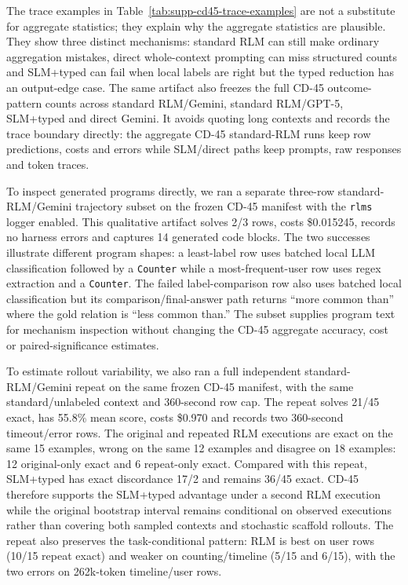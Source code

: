 \documentclass[letterpaper]{article}
\begin{document}
The trace examples in Table~\ref{tab:supp-cd45-trace-examples} are not a substitute for aggregate statistics; they explain why the aggregate statistics are plausible. They show three distinct mechanisms: standard RLM can still make ordinary aggregation mistakes, direct whole-context prompting can miss structured counts and SLM+typed can fail when local labels are right but the typed reduction has an output-edge case. The same artifact also freezes the full CD-45 outcome-pattern counts across standard RLM/Gemini, standard RLM/GPT-5, SLM+typed and direct Gemini. It avoids quoting long contexts and records the trace boundary directly: the aggregate CD-45 standard-RLM runs keep row predictions, costs and errors while SLM/direct paths keep prompts, raw responses and token traces.

To inspect generated programs directly, we ran a separate three-row standard-RLM/Gemini trajectory subset on the frozen CD-45 manifest with the \texttt{rlms} logger enabled. This qualitative artifact solves 2/3 rows, costs \$0.015245, records no harness errors and captures 14 generated code blocks. The two successes illustrate different program shapes: a least-label row uses batched local LLM classification followed by a \texttt{Counter} while a most-frequent-user row uses regex extraction and a \texttt{Counter}. The failed label-comparison row also uses batched local classification but its comparison/final-answer path returns ``more common than'' where the gold relation is ``less common than.'' The subset supplies program text for mechanism inspection without changing the CD-45 aggregate accuracy, cost or paired-significance estimates.

To estimate rollout variability, we also ran a full independent standard-RLM/Gemini repeat on the same frozen CD-45 manifest, with the same standard/unlabeled context and 360-second row cap. The repeat solves 21/45 exact, has 55.8\% mean score, costs \$0.970 and records two 360-second timeout/error rows. The original and repeated RLM executions are exact on the same 15 examples, wrong on the same 12 examples and disagree on 18 examples: 12 original-only exact and 6 repeat-only exact. Compared with this repeat, SLM+typed has exact discordance 17/2 and remains 36/45 exact. CD-45 therefore supports the SLM+typed advantage under a second RLM execution while the original bootstrap interval remains conditional on observed executions rather than covering both sampled contexts and stochastic scaffold rollouts. The repeat also preserves the task-conditional pattern: RLM is best on user rows (10/15 repeat exact) and weaker on counting/timeline (5/15 and 6/15), with the two errors on 262k-token timeline/user rows.
\end{document}
